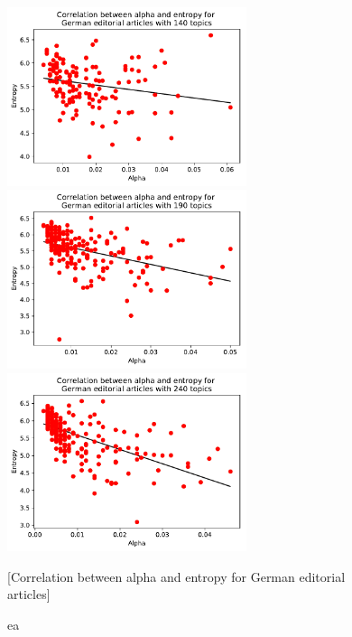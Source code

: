 \begin{figure}[h]
	\begin{minipage}[t]{0.5\textwidth}
		\includegraphics[width=7cm]{gfx/Correlation/German_editorial_articles_with_140_topics.pdf}
	\end{minipage}
	\begin{minipage}[t]{0.5\textwidth}
		\includegraphics[width=7cm]{gfx/Correlation/German_editorial_articles_with_190_topics.pdf}
	\end{minipage}
	\begin{minipage}[t]{0.5\textwidth}
		\includegraphics[width=7cm]{gfx/Correlation/German_editorial_articles_with_240_topics.pdf}
	\end{minipage}
	\caption{ea}[Correlation between alpha and entropy for German editorial articles]
	\label{correlation}
\end{figure}

